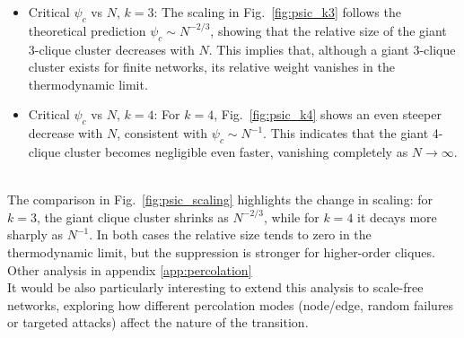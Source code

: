 \begin{itemize}
\item Critical $\psi_c$ vs $N$, $k=3$:  
The scaling in Fig.~\ref{fig:psic_k3} follows the theoretical prediction $\psi_c \sim N^{-2/3}$, showing that the relative size of the giant 3-clique cluster decreases with $N$.  
This implies that, although a giant 3-clique cluster exists for finite networks, its relative weight vanishes in the thermodynamic limit.

\item Critical $\psi_c$ vs $N$, $k=4$:  
For $k=4$, Fig.~\ref{fig:psic_k4} shows an even steeper decrease with $N$, consistent with $\psi_c \sim N^{-1}$.  
This indicates that the giant 4-clique cluster becomes negligible even faster, vanishing completely as $N \to \infty$.  
\end{itemize}\\
The comparison in Fig.~\ref{fig:psic_scaling} highlights the change in scaling:  
for $k=3$, the giant clique cluster shrinks as $N^{-2/3}$, while for $k=4$ it decays more sharply as $N^{-1}$.  
In both cases the relative size tends to zero in the thermodynamic limit, but the suppression is stronger for higher-order cliques. Other analysis in appendix \ref{app:percolation}\\
It would be also particularly interesting to extend this analysis to scale-free networks, exploring how different percolation modes (node/edge, random failures or targeted attacks) affect the nature of the transition. 


\newpage